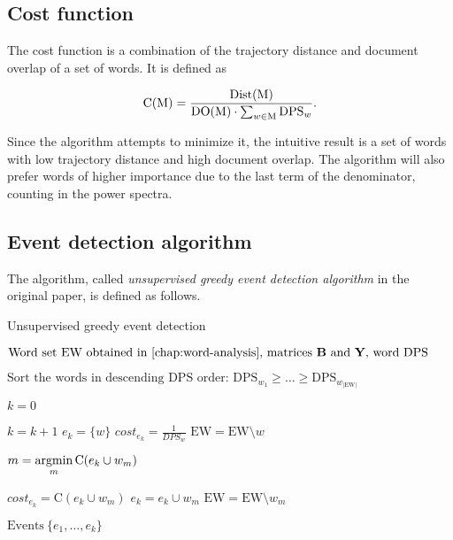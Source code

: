 \subsection{Cost function}
The cost function is a combination of the trajectory distance and document overlap of a set of words. It is defined as

\begin{equation} \label{eq:cost-function-original}
	\text{C}( \text{M} ) = \frac{\text{Dist}( \text{M} )}{\text{DO}( \text{M} ) \cdot \sum_{w \in \text{M}} \text{DPS}_{w}}.
\end{equation}

Since the algorithm attempts to minimize it, the intuitive result is a set of words with low trajectory distance and high document overlap. The algorithm will also prefer words of higher importance due to the last term of the denominator, counting in the power spectra.

\newpage

\subsection{Event detection algorithm}
The algorithm, called \textit{unsupervised greedy event detection algorithm} in the original paper, is defined as follows.

\begin{algorithm}[H]
\begin{algorithmic}[1]
\caption{Unsupervised greedy event detection}
\label{alg:greedy-event-detection}
\Input $\text{Word set} ~ \text{EW obtained in \autoref{chap:word-analysis}, matrices } \bowmat \text{ and }\trajmat \text{, word DPS}$

\State $\text{Sort the words in descending DPS order: } \text{DPS}_{w_{1}} \geq \dots \geq \text{DPS}_{w_{\left\vert \text{EW} \right\vert}}$

\State $k = 0$

	\State $k = k + 1$	
	\State $e_{k} = \{ w \}$
	\State $cost_{e_{k}} = \frac{1}{DPS_{w}}$
	\State $\text{EW} = \text{EW} \setminus w$
	
		\State $m = \operatorname*{argmin}\limits_{m}{\text{C}( e_{k} \cup w_{m} )}$

			\State $cost_{e_{k}} = \text{C}( e_{k} \cup w_{m} )$
			\State $e_{k} = e_{k} \cup w_{m}$
			\State $\text{EW} = \text{EW} \setminus w_{m}$
		\Else
			\Break
		\EndIf
	\EndWhile
\EndFor

\Output $\text{Events} ~ \{ e_{1}, \dots, e_{k} \}$
\end{algorithmic}
\end{algorithm}

